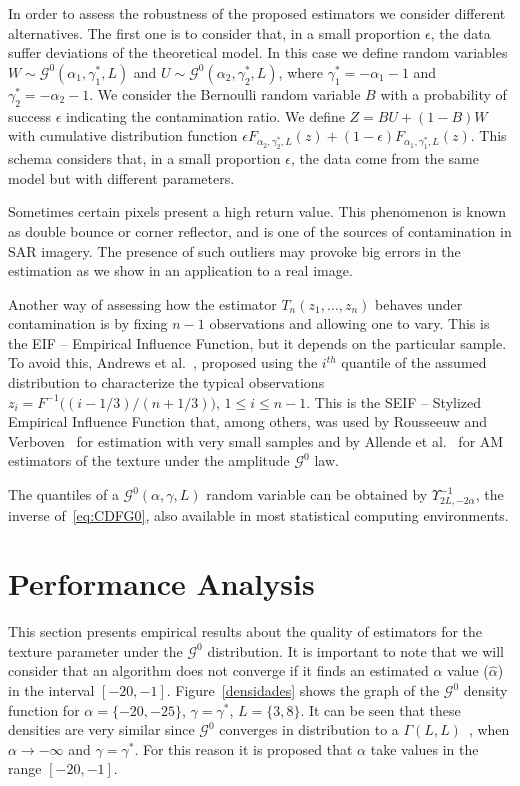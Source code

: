 \documentclass[twocolumn]{svjour3}
\begin{document}
	In order to assess the robustness of the proposed estimators we consider different alternatives. The first one is to consider that, in a small proportion $\epsilon$, the data suffer deviations of the theoretical model. In this case we define random variables $W \sim \mathcal{G}^0(\alpha_1,\gamma_1^*,L)$ and $U \sim \mathcal{G}^0(\alpha_2,\gamma_2^*,L)$, where $\gamma_1^*=-\alpha_1-1$ and  $\gamma_2^*=-\alpha_2-1$. 
	We consider the Bernoulli random variable $B$ with a probability of success $\epsilon$ indicating the contamination ratio.   
	We define $Z=BU+(1-B)W$ with cumulative distribution function   
	$
	\epsilon {F}_{\alpha_2,\gamma_2^*,L}(z)+(1-\epsilon) {F}_{\alpha_1,\gamma_1^*,L}(z)
	$.
	This schema considers that, in a small proportion $\epsilon$, the data come from the same model but with different parameters. 
	
	Sometimes certain pixels present a high return value. This phenomenon is known as double bounce or corner reflector, and is one of the sources of contamination in SAR imagery. The presence of such outliers may
	provoke big errors in the estimation as we show in an application to a real image. 
	
	Another way of assessing how the estimator $T_n(z_1,\dots,z_n)$ behaves under contamination is by fixing $n-1$ observations and allowing one to vary.
	This is the EIF -- Empirical Influence Function, but it depends on the particular sample.
	To avoid this, Andrews et al.~\cite{Andrews1972}, proposed using the $i^{th}$ quantile of the assumed distribution to characterize the typical observations $z_i=F^{-1}\big((i-1/3)/(n+1/3) \big)$, $1\leq i\leq n-1$.
	This is the SEIF -- Stylized Empirical Influence Function that, among others, was used by Rousseeuw and Verboven~\cite{RousseeuwCSDA} for estimation with very small samples and by Allende et al.~\cite{AllendeFreryetal:JSCS:05} for AM estimators of the texture under the amplitude $\mathcal G^0$ law.
	
	The quantiles of a $\mathcal G^0(\alpha,\gamma,L)$ random variable can be obtained by $\Upsilon^{-1}_{2L,-2\alpha}$, the inverse of~\eqref{eq:CDFG0}, also available in most statistical computing environments.
	
	
	\section{Performance Analysis}\label{simulation}
	
	This section presents empirical results about the quality of estimators for the texture parameter under the $\mathcal G^0$ distribution. It is important to note that we will consider that an algorithm does not converge if it finds an estimated $\alpha$ value ($\widehat{\alpha}$) in the interval $[-20,-1]$. 	Figure~\ref{densidades} shows the graph of the $\mathcal{G}^0$ density function for  $\alpha=\{-20,-25\}$, $\gamma=\gamma^*$, $L=\{3,8\}$. It can be seen that these densities are very similar since $\mathcal{G}^0$ converges in distribution to a $\Gamma(L,L)$~\cite{Frery99}, when  $\alpha \longrightarrow -\infty$ and $\gamma=\gamma^*$. For this reason it is proposed that $\alpha$ take values in the range $[-20,-1]$. 
	
\end{document}
